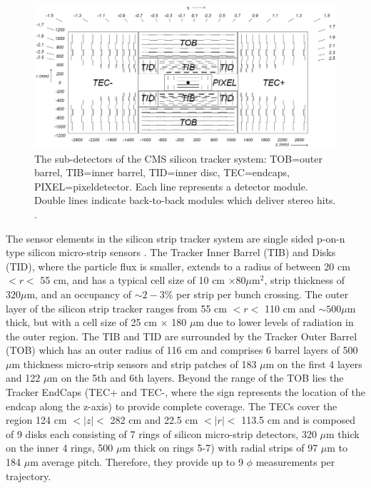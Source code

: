 \begin{figure} [h!] 
\includegraphics[width=\textwidth]{Figures/Tracker.png}
\caption{The sub-detectors of the CMS silicon tracker system: TOB=outer barrel, TIB=inner barrel, TID=inner disc, TEC=endcaps, PIXEL=pixeldetector. Each line represents a detector module. Double lines indicate back-to-back modules which deliver stereo hits. \cite{CMSexperiment}.}
\label{fig-Tracker}
\end{figure}

The sensor elements in the silicon strip tracker system are single sided p-on-n type silicon micro-strip sensors \cite{SiliconStripSensors1,SiliconStripSensors2}. The Tracker Inner Barrel (TIB) and Disks (TID), where the particle flux is smaller, extends to a radius of between 20 cm $< r <$ 55 cm, and has a typical cell size of 10 cm $\times 80 \mu$m$^2$, strip thickness of $320 \mu$m, and an occupancy of $\sim2-3\%$ per strip per bunch crossing. The outer layer of the silicon strip tracker ranges from 55 cm $< r <$ 110 cm and $\sim500 \mu$m thick, but with a cell size of 25 cm $\times$ 180 $\mu$m due to lower levels of radiation in the outer region. The TIB and TID are surrounded by the Tracker Outer Barrel (TOB) which has an outer radius of 116 cm and comprises 6 barrel layers of 500 $\mu$m thickness micro-strip sensors and strip patches of 183 $\mu$m on the first 4 layers and 122 $\mu$m on the 5th and 6th layers. Beyond the range of the TOB lies the Tracker EndCaps (TEC+ and TEC-, where the sign represents the location of the endcap along the z-axis) to provide complete coverage. The TECs cover the region 124 cm $<|z|<$ 282 cm and 22.5 cm $<|r|<$ 113.5 cm and is composed of 9 disks each consisting of 7 rings of silicon micro-strip detectors, 320 $\mu$m thick on the inner 4 rings, 500 $\mu$m thick on rings 5-7) with radial strips of 97 $\mu$m to 184 $\mu$m average pitch. Therefore, they provide up to 9 $\phi$ measurements per trajectory.


